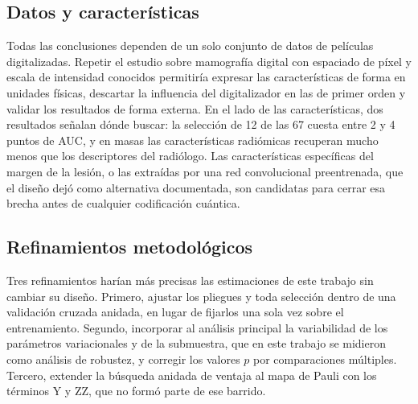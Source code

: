 \subsection{Datos y características}
\label{sec:futuro_datos}

Todas las conclusiones dependen de un solo conjunto de datos de películas digitalizadas. Repetir el
estudio sobre mamografía digital con espaciado de píxel y escala de intensidad conocidos permitiría
expresar las características de forma en unidades físicas, descartar la influencia del digitalizador en
las de primer orden y validar los resultados de forma externa. En el lado de las características, dos
resultados señalan dónde buscar: la selección de 12 de las 67 cuesta entre 2 y 4 puntos de AUC, y en
masas las características radiómicas recuperan mucho menos que los descriptores del radiólogo. Las
características específicas del margen de la lesión, o las extraídas por una red convolucional
preentrenada, que el diseño dejó como alternativa documentada, son candidatas para cerrar esa brecha antes
de cualquier codificación cuántica.

\subsection{Refinamientos metodológicos}
\label{sec:futuro_metodologia}

Tres refinamientos harían más precisas las estimaciones de este trabajo sin cambiar su diseño. Primero,
ajustar los pliegues y toda selección dentro de una validación cruzada anidada, en lugar de fijarlos una
sola vez sobre el entrenamiento. Segundo, incorporar al análisis principal la variabilidad de los
parámetros variacionales y de la submuestra, que en este trabajo se midieron como análisis de robustez, y
corregir los valores $p$ por comparaciones múltiples. Tercero, extender la búsqueda anidada de ventaja al
mapa de Pauli con los términos Y y ZZ, que no formó parte de ese barrido.
